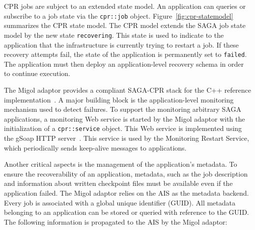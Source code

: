 \documentclass[times, 10pt, twocolumn]{article}
\begin{document}
CPR jobs are subject to an extended state model. An application can queries or subscribe to a job state via the \texttt{cpr::job} object.      
Figure~\ref{fig:cpr-statemodel} summarizes the CPR state model. The CPR model extends the SAGA job state model by the new state \texttt{recovering}. This state
is used to indicate to the application that the infrastructure is currently trying to restart a job. 
If these recovery attempts fail, the state of the application is permanently set to \texttt{failed}. 
The application must then deploy an application-level recovery schema in order to continue execution. 


The Migol adaptor provides a compliant SAGA-CPR stack for the C++ reference implementation~\cite{Kaiser:2006qp}. 
A major building block is the application-level monitoring mechanism used to detect failures. 
To support the monitoring arbitrary SAGA applications, a monitoring Web service is started 
by the Migol adaptor with the initialization of a \texttt{cpr::service} object. This Web 
service is implemented using the gSoap HTTP server~\cite{gsoap}.  This service is used by the Monitoring Restart Service,
which periodically sends keep-alive messages to applications.                                                                             



Another critical aspects is the management of the application's
metadata. To ensure the recoverability of an application, metadata,
such as the job description and information about written checkpoint
files must be available even if the application failed. The Migol
adaptor relies on the AIS as the metadata backend. Every job is
associated with a global unique identifier (GUID).
All metadata belonging to an application can be stored or queried with
reference to the GUID.  The following information is propagated to the
AIS by the Migol adaptor:
\end{document}
